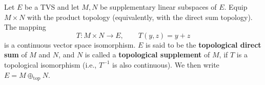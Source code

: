 Let $E$ be a TVS and let $M, N$ be supplementary linear subspaces of $E$. Equip $M \times N$ with the product topology (equivalently, with the direct sum topology). The mapping
$$T \colon M \times N \to E, \qquad T(y, z) = y + z$$
is a continuous vector space isomorphism. $E$ is said to be the \textbf{topological direct sum} of $M$ and $N$, and $N$ is called a \textbf{topological supplement} of $M$, if $T$ is a topological isomorphism (i.e., $T^{-1}$ is also continuous). We then write $E = M \oplus_{\text{top}} N$.
